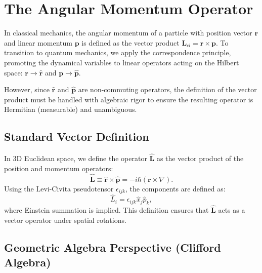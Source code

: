 \section{The Angular Momentum Operator}

In classical mechanics, the angular momentum of a particle with position vector
$\mathbf{r}$ and linear momentum $\mathbf{p}$ is defined as the vector product
$\mathbf{L}_{cl} = \mathbf{r} \times \mathbf{p}$. To transition to quantum
mechanics, we apply the correspondence principle, promoting the dynamical
variables to linear operators acting on the Hilbert space: $\mathbf{r} \to
\hat{\mathbf{r}}$ and $\mathbf{p} \to \hat{\mathbf{p}}$.

However, since $\hat{\mathbf{r}}$ and $\hat{\mathbf{p}}$ are non-commuting
operators, the definition of the vector product must be handled with algebraic
rigor to ensure the resulting operator is Hermitian (measurable) and
unambiguous.

\subsection{Standard Vector Definition}

In 3D Euclidean space, we define the operator $\hat{\mathbf{L}}$ as the vector
product of the position and momentum operators:
\begin{equation}
  \hat{\mathbf{L}} \equiv \hat{\mathbf{r}} \times \hat{\mathbf{p}} = -i\hbar
  (\mathbf{r} \times \nabla).
\end{equation}
Using the Levi-Civita pseudotensor $\epsilon_{ijk}$, the components are defined
as:
\begin{equation} \label{eq:L_tensor_def}
  \hat{L}_i = \epsilon_{ijk} \hat{x}_j \hat{p}_k,
\end{equation}
where Einstein summation is implied. This definition ensures that
$\hat{\mathbf{L}}$ acts as a vector operator under spatial rotations.

\subsection{Geometric Algebra Perspective (Clifford Algebra)}

